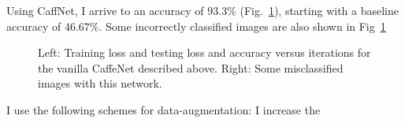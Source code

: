 \documentclass[5pt]{article}
\begin{document}
Using CaffNet, I arrive to an accuracy of $93.3\%$
(Fig.~\ref{fig:sunset_vanilla}), starting with a baseline accuracy of
$46.67\%$. Some incorrectly classified images are also shown in
Fig~\ref{fig:sunset_vanilla}

\begin{figure}[h]
  \centering{}
  \caption{Left: Training loss and testing loss and accuracy versus iterations for
  the vanilla CaffeNet described above. Right: Some misclassified images with
  this network.}
\label{fig:sunset_vanilla}
\end{figure}

I use the following schemes for data-augmentation: I increase the 

\medskip


\end{document}
